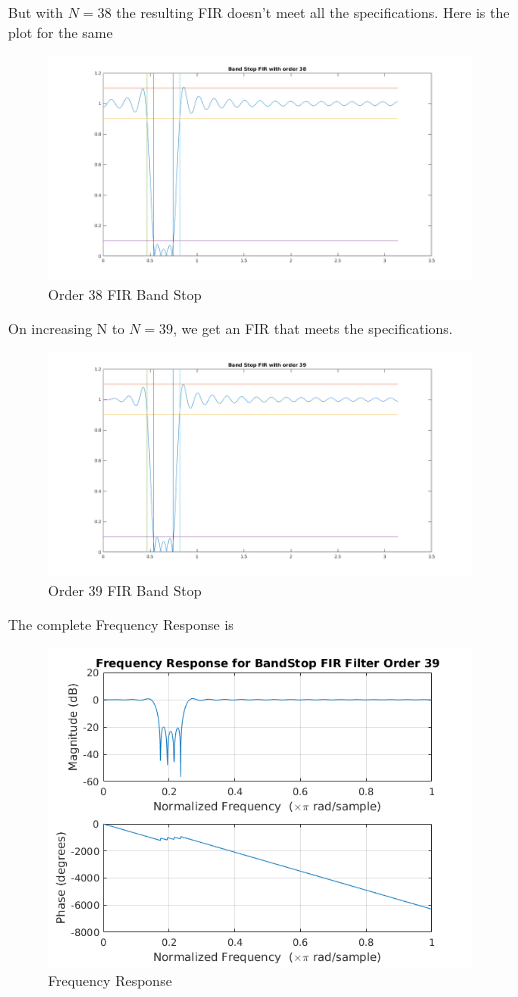 \documentclass[22pt]{article}
\begin{document}
But with $N = 38$ the resulting FIR doesn't meet all the specifications. Here is the plot for the same
\begin{figure}[H]
  \centering
  \includegraphics[scale=0.5]{images/Band_stop_fir_order_38}
  \caption{Order 38 FIR Band Stop}
  \label{fig:7}
\end{figure}

On increasing N to $N = 39$, we get an FIR that meets the specifications.
\begin{figure}[H]
  \centering
  \includegraphics[scale=0.5]{images/Band_stop_fir_order_39}
  \caption{Order 39 FIR Band Stop}
  \label{fig:8}
\end{figure}


The complete Frequency Response is
\begin{figure}[H]
  \centering
  \includegraphics[scale=0.75]{images/FIR_bs_freqz}
  \caption{Frequency Response}
  \label{fig:9}
\end{figure}
\end{document}
